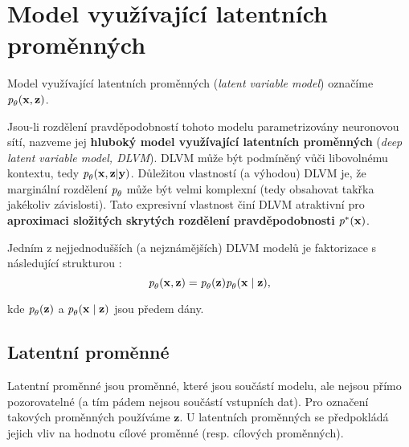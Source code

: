 \section{Model využívající latentních proměnných}
\label{sec:latent_variable_models}
Model využívající latentních proměnných (\emph{latent variable model}) označíme $\emph{p}_\theta(\mathbf{x}, \mathbf{z})$.

Jsou-li rozdělení pravděpodobností tohoto modelu parametrizovány neuronovou sítí,
nazveme jej \textbf{hluboký model využívající latentních proměnných} (\emph{deep latent variable model, DLVM}). DLVM může být podmíněný vůči libovolnému kontextu, tedy $\emph{p}_{\theta}(\mathbf{x}, \mathbf{z}|\mathbf{y})$.
Důležitou vlastností (a výhodou) DLVM je, že marginální rozdělení $\emph{p}_\theta$ může být velmi komplexní (tedy obsahovat takřka jakékoliv závislosti).
Tato expresivní vlastnost činí DLVM atraktivní pro \textbf{aproximaci složitých skrytých rozdělení pravděpodobnosti} $\emph{p}^*(\mathbf{x})$. \cite{Kingma2019}

Jedním z nejjednodušších (a nejznámějších) DLVM modelů je faktorizace s následující strukturou \cite{Kingma2019}:
\begin{equation}
    \emph{p}_\theta(\mathbf{x}, \mathbf{z}) = \emph{p}_\theta(\mathbf{z})\emph{p}_\theta(\mathbf{x}\mid\mathbf{z}),
\end{equation}

kde $\emph{p}_\theta(\mathbf{z})$ a $\emph{p}_\theta(\mathbf{x}\mid\mathbf{z})$ jsou předem dány.
\subsection{Latentní proměnné}
Latentní proměnné jsou proměnné, které jsou součástí modelu, ale nejsou přímo pozorovatelné (a tím pádem nejsou součástí vstupních dat).
Pro označení takových proměnných používáme $\mathbf{z}$. U latentních proměnných se předpokládá jejich vliv na hodnotu cílové proměnné (resp. cílových proměnných). \cite{Kingma2019}

